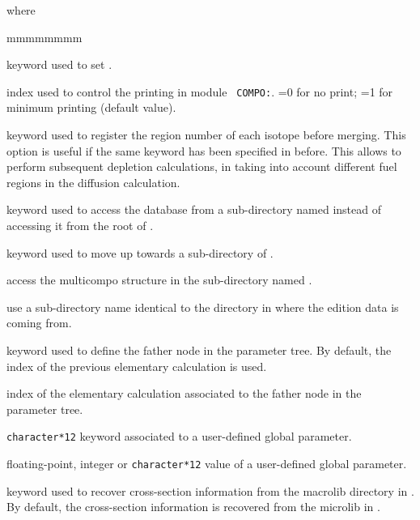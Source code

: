 \noindent where
\begin{ListeDeDescription}{mmmmmmmm}

\item[\moc{EDIT}] keyword used to set .

\item[\dusa{iprint}] index used to control the printing in module {\tt
COMPO:}. =0 for no print; =1 for minimum printing (default value).

\item[\moc{ALLX}] keyword used to register the region number of each isotope before merging. This option is useful if the same
keyword has been specified in  before. This allows to perform subsequent depletion calculations, in taking into account
different fuel regions in the diffusion calculation.

\item[\moc{STEP}] keyword used to access the database from a sub-directory named  instead of
accessing it from the root of .

\item[\moc{UP}] keyword used to move up towards a sub-directory of .

\item[\dusa{NAMDIR}] access the {\sc multicompo} structure in the sub-directory named .

\item[\moc{*}] use a sub-directory name identical to the directory in 
where the edition data is coming from.

\item[\moc{ORIG}] keyword used to define the father node in the parameter tree. By
default, the index of the previous elementary calculation is used.

\item[\dusa{orig}] index of the elementary calculation associated to the father node in the
parameter tree.

\item[\dusa{PARKEY}] {\tt character*12} keyword associated to a user-defined
global parameter.

\item[\dusa{value}] floating-point, integer or {\tt character*12} value of a user-defined
global parameter.

\item[\moc{MACRO}] keyword used to recover cross-section information from the
macrolib directory in . By default, the cross-section information
is recovered from the microlib in .


\end{ListeDeDescription}
